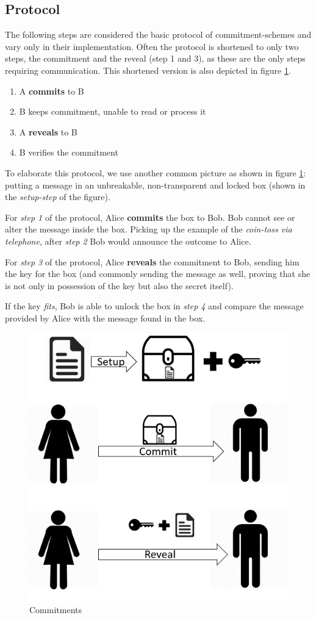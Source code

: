 \subsection{Protocol}
The following steps are considered the basic protocol of commitment-schemes and vary only in their implementation. Often the protocol is shortened to only two steps, the commitment and the reveal (step 1 and 3), as these are the only steps requiring communication. This shortened version is also depicted in figure \ref{fig:protocoll}.  
\begin{enumerate}
	\item A \textbf{commits} to B
	\item B keeps commitment, unable to read or process it
	\item A \textbf{reveals} to B
	\item B verifies the commitment 
\end{enumerate}
To elaborate this protocol, we use another common picture as shown in figure \ref{fig:protocoll}: putting a message in an unbreakable, non-transparent and locked box (shown in the \textit{setup-step} of the figure).

For \textit{step 1} of the protocol, Alice \textbf{commits} the box to Bob. Bob cannot see or alter the message inside the box. Picking up the example of the \textit{coin-toss via telephone}, after \textit{step 2} Bob would announce the outcome to Alice.
 
For \textit{step 3} of the protocol, Alice \textbf{reveals} the commitment to Bob, sending him the key for the box (and commonly sending the message as well, proving that she is not only in possession of the key but also the secret itself). 

If the key \textit{fits}, Bob is able to unlock the box in \textit{step 4} and compare the message provided by Alice with the message found in the box. 
\begin{figure}
	\centering
	\includegraphics[width=0.8\linewidth]{Images/protocoll}
	\caption[Commitments]{Commitments}
	\label{fig:protocoll}
\end{figure}

